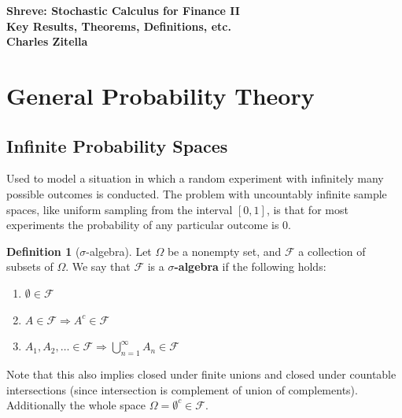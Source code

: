 \documentclass[11pt]{article}
\theoremstyle{definition}
\theoremstyle{definition}
\theoremstyle{definition}
\newtheorem{definition}{\textcolor{OliveGreen}{Definition}}
\theoremstyle{remark}
\begin{document}
\begin{center}
	\textbf{Shreve: Stochastic Calculus for Finance II} \\
	\textbf{Key Results, Theorems, Definitions, etc.} \\
	\textbf{Charles Zitella}
\end{center}

\begin{abstract}
	This document contains a summary of key results, theorems, and definitions that I deem important or interesting.
    This is not a comprehensive summary of the textbook, but a taste...
\end{abstract}

\tableofcontents

\section{General Probability Theory}

\subsection{Infinite Probability Spaces}

Used to model a situation in which a random experiment with infinitely many possible outcomes is conducted.
The problem with uncountably infinite sample spaces, like uniform sampling from the interval $[0, 1]$, is
that for most experiments the probability of any particular outcome is $0$. 

\begin{definition}[$\sigma$-algebra]
    Let $\Omega$ be a nonempty set, and $\mathcal{F}$ a collection of subsets of $\Omega$. We say that $\mathcal{F}$
    is a \textbf{$\sigma$-algebra} if the following holds:
    \begin{enumerate}
        \item $\emptyset \in \mathcal{F}$ 
        \item $A \in \mathcal{F} \Rightarrow A^c \in \mathcal{F}$ 
        \item $A_1, A_2, \dots \in \mathcal{F} \Rightarrow \bigcup_{n = 1}^\infty A_n \in \mathcal{F}$          
    \end{enumerate}    
    Note that this also implies closed under finite unions and closed under countable intersections (since intersection is complement of union of complements).
    Additionally the whole space $\Omega = \emptyset^c \in \mathcal{F}$.
\end{definition}
\end{document}
